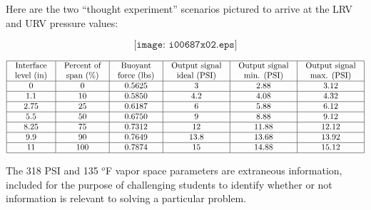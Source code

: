 





Here are the two ``thought experiment'' scenarios pictured to arrive at the LRV and URV pressure values:

$$\texttt{[image: i00687x02.eps]}$$


$$\vbox{\offinterlineskip
\halign{\strut
\vrule \quad\hfil # \ \hfil & 
\vrule \quad\hfil # \ \hfil & 
\vrule \quad\hfil # \ \hfil & 
\vrule \quad\hfil # \ \hfil & 
\vrule \quad\hfil # \ \hfil & 
\vrule \quad\hfil # \ \hfil \vrule \cr
\noalign{\hrule}
%
Interface & Percent of & Buoyant & Output signal & Output signal & Output signal \cr
%
level (in) & span (\%) & force (lbs) & ideal (PSI) & min. (PSI) & max. (PSI) \cr
%
\noalign{\hrule}
%
0 & 0 & 0.5625 & 3 & 2.88 & 3.12 \cr
%
\noalign{\hrule}
%
1.1 & 10 & 0.5850 & 4.2 & 4.08 & 4.32 \cr
%
\noalign{\hrule}
%
2.75 & 25 & 0.6187 & 6 & 5.88 & 6.12 \cr
%
\noalign{\hrule}
%
5.5 & 50 & 0.6750 & 9 & 8.88 & 9.12 \cr
%
\noalign{\hrule}
%
8.25 & 75 & 0.7312 & 12 & 11.88 & 12.12 \cr
%
\noalign{\hrule}
%
9.9 & 90 & 0.7649 & 13.8 & 13.68 & 13.92 \cr
%
\noalign{\hrule}
%
11 & 100 & 0.7874 & 15 & 14.88 & 15.12 \cr
%
\noalign{\hrule}
} %
}$$ %

\vskip 10pt

The 318 PSI and 135 $^{o}$F vapor space parameters are extraneous information, included for the purpose of challenging students to identify whether or not information is relevant to solving a particular problem.





